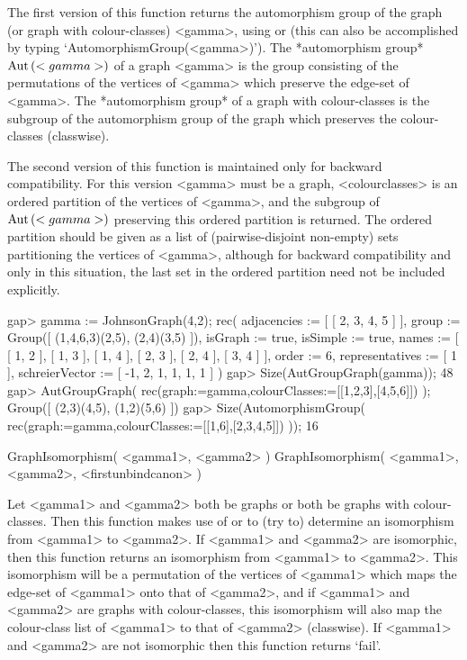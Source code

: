 The first version of this function returns the automorphism group of
the graph (or graph with colour-classes) <gamma>, using {\nauty} 
or {\bliss} (this can also be accomplished by typing
`AutomorphismGroup(<gamma>)'). The *automorphism group* ${\rm Aut}\,(<gamma>)$
of a graph <gamma> is the group consisting of the permutations
of the vertices of <gamma> which preserve the edge-set of <gamma>.
The *automorphism group* of a graph with colour-classes is the subgroup
of the automorphism group of the graph which preserves the colour-classes
(classwise).

The second version of this function is maintained only for backward
compatibility. For this version <gamma> must be a graph, <colourclasses>
is an ordered partition of the vertices of <gamma>, and the subgroup of
${\rm Aut}\,(<gamma>)$ preserving this ordered partition is returned. The ordered
partition should be given as a list of (pairwise-disjoint non-empty) sets
partitioning the vertices of <gamma>, although for backward compatibility
and only in this situation, the last set in the ordered partition need
not be included explicitly.

\beginexample
gap> gamma := JohnsonGraph(4,2);                   
rec( adjacencies := [ [ 2, 3, 4, 5 ] ], 
  group := Group([ (1,4,6,3)(2,5), (2,4)(3,5) ]), isGraph := true, 
  isSimple := true, 
  names := [ [ 1, 2 ], [ 1, 3 ], [ 1, 4 ], [ 2, 3 ], [ 2, 4 ], [ 3, 4 ] ], 
  order := 6, representatives := [ 1 ], 
  schreierVector := [ -1, 2, 1, 1, 1, 1 ] )
gap> Size(AutGroupGraph(gamma)); 
48
gap> AutGroupGraph( rec(graph:=gamma,colourClasses:=[[1,2,3],[4,5,6]]) ); 
Group([ (2,3)(4,5), (1,2)(5,6) ])
gap> Size(AutomorphismGroup( rec(graph:=gamma,colourClasses:=[[1,6],[2,3,4,5]]) )); 
16
\endexample


\>GraphIsomorphism( <gamma1>, <gamma2> )
\>GraphIsomorphism( <gamma1>, <gamma2>, <firstunbindcanon> )

Let <gamma1> and <gamma2> both be graphs or both be graphs with
colour-classes.  Then this function makes use of {\nauty} or {\bliss} to
(try to) determine an isomorphism from <gamma1> to <gamma2>.  If <gamma1>
and <gamma2> are isomorphic, then this function returns an isomorphism
from <gamma1> to <gamma2>. This isomorphism will be a permutation of the
vertices of <gamma1> which maps the edge-set of <gamma1> onto that of
<gamma2>, and if <gamma1> and <gamma2> are graphs with colour-classes,
this isomorphism will also map the colour-class list of <gamma1> to that
of <gamma2> (classwise). If <gamma1> and <gamma2> are not isomorphic
then this function returns `fail'.

